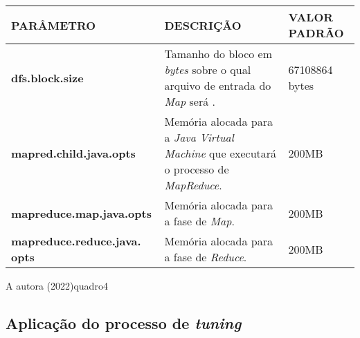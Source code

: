 {\footnotesize
  \centering
  \begin{tabular}{|p{40mm}|p{50mm}|p{30mm}|}\hline
    \textbf{PARÂMETRO}                   & \textbf{DESCRIÇÃO}                                                                                   & \textbf{VALOR PADRÃO} \\\hline
    \textbf{dfs.block.size}              & Tamanho do bloco em \textit{bytes} sobre o qual arquivo de entrada do \textit{Map} será .            & 67108864 bytes        \\\hline
    \textbf{mapred.child.java.opts}      & Memória alocada para a \textit{Java Virtual Machine} que executará o processo de \textit{MapReduce}. & 200MB                 \\\hline
    \textbf{mapreduce.map.java.opts}     & Memória alocada para a fase de \textit{Map}.                                                         & 200MB                 \\\hline
    \textbf{mapreduce.reduce.java. opts} & Memória alocada para a fase de \textit{Reduce}.                                                      & 200MB                 \\\hline
  \end{tabular}}
{A autora (2022)}{quadro4}{}{}


\newpage
\subsection{Aplicação do processo de \textit{tuning}}\label{ssec:aplicacao tuning}
